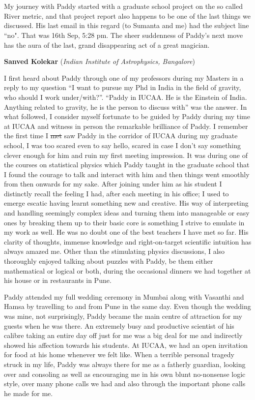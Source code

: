 \documentclass[prd, preprint, longbibliography, 12pt]{revtex4-2}
\begin{document}
\\
\\
My journey with Paddy started with a graduate school project on the so called River metric, and that project report also happens to be one of the last things we discussed. His last email in this regard (to Sumanta and me) had the subject line ``no". That was 16th Sep, 5:28 pm. The sheer suddenness of Paddy's next move has the aura of the last, grand disappearing act of a great magician. 

\bigskip

\bigskip

\centerline{{\bf Sanved Kolekar} ({\it Indian Institute of Astrophysics, Bangalore})}
\medskip
\noindent I first heard about Paddy through one of my professors during my Masters in a reply to my question “I want to pursue my Phd in India in the field of gravity, who should I work under/with?”. “Paddy in IUCAA. He is the Einstein of India. Anything related to gravity, he is the person to discuss with” was the answer. In what followed, I consider myself fortunate to be guided by Paddy during my time at IUCAA and witness in person the remarkable brilliance of Paddy. I remember the first time I \st{met} saw Paddy in the corridor of IUCAA during my graduate school, I was too scared even to say hello, scared in case I don’t say something clever enough for him and ruin my first meeting impression. It was during one of the courses on statistical physics which Paddy taught in the graduate school that I found the courage to talk and interact with him and then things went smoothly from then onwards for my sake. After joining under him as his student I distinctly recall the feeling I had, after each meeting in his office; I used to emerge escatic having learnt something new and creative. His way of interpreting and handling seemingly complex ideas and turning them into manageable or easy ones by breaking them up to their basic core is something I strive to emulate in my work as well. He was no doubt one of the best teachers I have met so far. His clarity of thoughts, immense knowledge and right-on-target scientific intuition has always amazed me. Other than the stimulating physics discussions, I also thoroughly enjoyed talking about puzzles with Paddy, be them either mathematical or logical or both, during the occasional dinners we had together at his house or in restaurants in Pune. 

Paddy attended my full wedding ceremony in Mumbai along with Vasanthi and Hamsa by travelling to and from Pune in the same day. Even though the wedding was mine, not surprisingly, Paddy became the main centre of attraction for my guests when he was there. An extremely busy and productive scientist of his calibre taking an entire day off just for me was a big deal for me and indirectly showed his affection towards his students. At IUCAA, we had an open invitation for food at his home whenever we felt like. When a terrible personal tragedy struck in my life, Paddy was always there for me as a fatherly guardian, looking over and consoling as well as encouraging me in his own blunt no-nonsense logic style, over many phone calls we had and also through the important phone calls he made for me.
\end{document}
